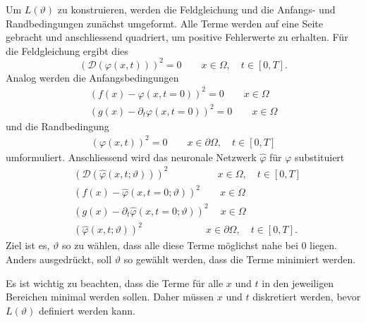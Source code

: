 Um \( L(\vartheta) \) zu konstruieren, werden die Feldgleichung und die Anfangs- und Randbedingungen zunächst umgeformt.
Alle Terme werden auf eine Seite gebracht und anschliessend quadriert, um positive Fehlerwerte zu erhalten.
Für die Feldgleichung ergibt dies
\begin{equation}
    \left(\mathcal{D}(\varphi(x, t))\right)^2 = 0 \qquad x \in \Omega, \quad t \in [0,T].
    \label{neuronal:feldgleichung_umformuliert}
\end{equation}
Analog werden die Anfangsbedingungen
\begin{equation}
    \begin{aligned}
        \left(f(x) - \varphi(x, t = 0)\right)^2 = 0 \qquad x \in \Omega\\
        \left(g(x) - \partial_t \varphi(x, t = 0)\right)^2 = 0 \qquad x \in \Omega
    \end{aligned}
    \label{neuronal:anfangsbedingung_umformuliert}
\end{equation}
und die Randbedingung
\begin{equation}
    \begin{aligned}
        \left(\varphi(x, t)\right)^2 = 0 \qquad x \in \partial \Omega, \quad t \in [0,T]
    \end{aligned}
    \label{neuronal:randbedingung_umformuliert}
\end{equation}
umformuliert.
Anschliessend wird das neuronale Netzwerk $\hat{\varphi}$ für $\varphi$ substituiert
\begin{equation}
    \begin{aligned}
        &\left(\mathcal{D}(\hat{\varphi}(x, t; \vartheta))\right)^2 \qquad \qquad \quad x \in \Omega, \quad t \in [0,T]\\
        &\left(f(x) - \hat{\varphi}(x, t = 0; \vartheta)\right)^2 \qquad x \in \Omega\\
        &\left(g(x) - \partial_t \hat{\varphi}(x, t = 0; \vartheta)\right)^2 \quad \: x \in \Omega\\
        &\left(\hat{\varphi}(x, t; \vartheta)\right)^2 \qquad \qquad \qquad \: \: x \in \partial \Omega, \quad t \in [0,T].
    \end{aligned}
    \label{neuronal:umformuliert_nn}
\end{equation}
Ziel ist es, $\vartheta$ so zu wählen, dass alle diese Terme möglichst nahe bei 0 liegen.
Anders ausgedrückt, soll $\vartheta$ so gewählt werden, dass die Terme minimiert werden.

Es ist wichtig zu beachten, dass die Terme für alle $x$ und $t$ in den jeweiligen Bereichen minimal werden sollen.
Daher müssen $x$ und $t$ diskretiert werden, bevor $L(\vartheta)$ definiert werden kann.

